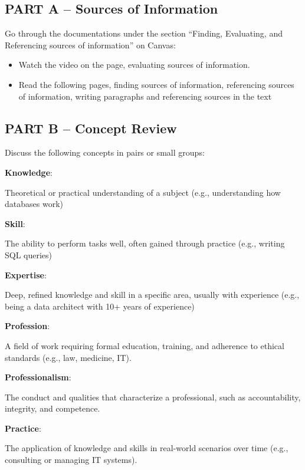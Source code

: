 \subsection{PART A – Sources of Information}

\indent 

Go through the documentations under the section “Finding, Evaluating, and Referencing sources of information” on Canvas:

\begin{itemize}
    \item Watch the video on the page, evaluating sources of information.
    \item Read the following pages, finding sources of information, referencing sources of information, writing paragraphs and referencing sources in the text
\end{itemize}

\subsection{PART B – Concept Review}

\indent 

Discuss the following concepts in pairs or small groups:

\noindent\textbf{Knowledge}: 


Theoretical or practical understanding of a subject (e.g., understanding how databases work)

\noindent\textbf{Skill}: 

The ability to perform tasks well, often gained through practice (e.g., writing SQL queries)

\noindent\textbf{Expertise}: 

Deep, refined knowledge and skill in a specific area, usually with experience (e.g., being a data architect with 10+ years of experience)

\noindent\textbf{Profession}: 

A field of work requiring formal education, training, and adherence to ethical standards (e.g., law, medicine, IT).

\noindent\textbf{Professionalism}: 

The conduct and qualities that characterize a professional, such as accountability, integrity, and competence.

\noindent\textbf{Practice}: 

The application of knowledge and skills in real-world scenarios over time (e.g., consulting or managing IT systems).

